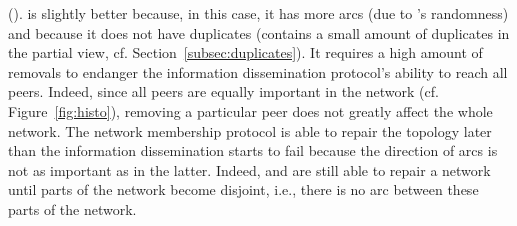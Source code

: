 \begin{asparadesc}
  (). \CYCLON is slightly better because, in this case, it has more
  arcs (due to \SPRAY's randomness) and because it does not have duplicates
  (\SPRAY contains a small amount of duplicates in the partial view,
  cf. Section~\ref{subsec:duplicates}). It requires a high amount of removals
  to endanger the information dissemination protocol's ability to reach all
  peers. Indeed, since all peers are equally important in the network
  (cf. Figure~\ref{fig:histo}), removing a particular peer does not
  greatly affect the whole network. The network membership protocol is able to
  repair the topology later than the information dissemination starts to fail
  because the direction of arcs is not as important as in the latter. Indeed,
  \CYCLON and \SPRAY are still able to repair a network until parts of the
  network become disjoint, i.e., there is no arc between these parts of the
  network.
\end{asparadesc}



